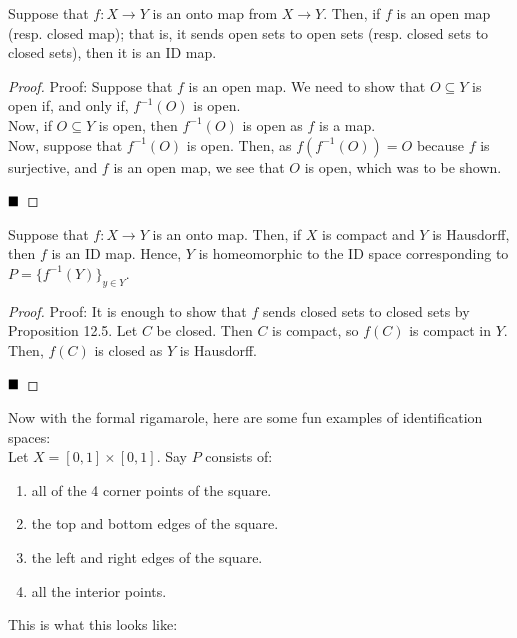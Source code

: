 \begin{lemma}
    Suppose that $f : X \to Y$ is an onto map from $X \to Y$. Then, if $f$ is an open map (resp. closed map); that is, it sends open sets to open sets (resp. closed sets to closed sets), then it is an ID map.
\end{lemma}
\begin{proof}{Proof:}
    Suppose that $f$ is an open map. We need to show that $O \subseteq Y$ is open if, and only if, $f^{-1}(O)$ is open.\\

    Now, if $O \subseteq Y$ is open, then $f^{-1}(O)$ is open as $f$ is a map.\\

    Now, suppose that $f^{-1}(O)$ is open. Then, as $f(f^{-1}(O)) = O$ because $f$ is surjective, and $f$ is an open map, we see that $O$ is open, which was to be shown.

    $\qed$
\end{proof}


\begin{lemma}
    Suppose that $f : X \to Y$ is an onto map. Then, if $X$ is compact and $Y$ is Hausdorff, then $f$ is an ID map. Hence, $Y$ is homeomorphic to the ID space corresponding to $P = \{f^{-1}(Y)\}_{y \in Y}$. 
\end{lemma}
\begin{proof}{Proof:}
    It is enough to show that $f$ sends closed sets to closed sets by Proposition 12.5. Let $C$ be closed. Then $C$ is compact, so $f(C)$ is compact in $Y$. Then, $f(C)$ is closed as $Y$ is Hausdorff.

    $\qed$
\end{proof}

Now with the formal rigamarole, here are some fun examples of identification spaces:\\

Let $X = [0, 1] \times [0, 1]$. Say $P$ consists of:
\begin{enumerate}
    \item all of the 4 corner points of the square.
    \item the top and bottom edges of the square.
    \item the left and right edges of the square.
    \item all the interior points.
\end{enumerate}
This is what this looks like:

